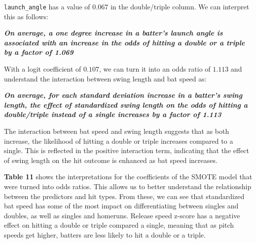 \documentclass[
  letterpaper,
  DIV=11,
  numbers=noendperiod]{scrartcl}
\begin{document}
\texttt{launch\_angle} has a value of \(0.067\) in the double/triple
column. We can interpret this as follows:

\textbf{\emph{On average, a one degree increase in a batter's launch
angle is associated with an increase in the odds of hitting a double or
a triple by a factor of 1.069}}

With a logit coefficient of \(0.107\), we can turn it into an odds ratio
of \(1.113\) and understand the interaction between swing length and bat
speed as:

\textbf{\emph{On average, for each standard deviation increase in a
batter's swing length, the effect of standardized swing length on the
odds of hitting a double/triple instead of a single increases by a
factor of 1.113}}

The interaction between bat speed and swing length suggests that as both
increase, the likelihood of hitting a double or triple increases
compared to a single. This is reflected in the positive interaction
term, indicating that the effect of swing length on the hit outcome is
enhanced as bat speed increases.

\textbf{Table 11} shows the interpretations for the coefficients of the
SMOTE model that were turned into odds ratios. This allows us to better
understand the relationship between the predictors and hit types. From
these, we can see that standardized bat speed has some of the most
impact on differentiating between singles and doubles, as well as
singles and homeruns. Release speed z-score has a negative effect on
hitting a double or triple compared a single, meaning that as pitch
speeds get higher, batters are less likely to hit a double or a triple.

\newpage
\end{document}

